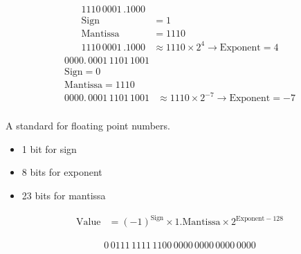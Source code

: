 \begin{example}
    \begin{align*}
        1110\,0001\,.1000 &                                                \\
        \text{Sign}       & = 1                                            \\
        \text{Mantissa}   & = 1110                                         \\
        1110\,0001\,.1000 & \approx 1110\times 2^4 \to \text{Exponent} = 4
    \end{align*}
    \begin{align*}
        0000.\,0001\,1101\,1001                                                      \\
        \text{Sign} = 0                                                              \\
        \text{Mantissa} = 1110                                                       \\
        0000.\,0001\,1101\,1001 & \approx 1110\times 2^{-7} \to \text{Exponent} = -7 \\
    \end{align*}

\end{example}

\begin{definition}
    [IEEE 754]
    A standard for floating point numbers. \\
    \begin{itemize}
        \item 1 bit for sign
        \item 8 bits for exponent
        \item 23 bits for mantissa
    \end{itemize}
\end{definition}

\begin{theorem}
    [IEEE 754]
    \begin{align*}
        \text{Value} & = (-1)^{\text{Sign}} \times 1.\text{Mantissa} \times 2^{\text{Exponent} - 128}
    \end{align*}
\end{theorem}

\begin{example}
    \begin{align*}
        0\,0111\,1111\,1100\,0000\,0000\,0000\,0000 \\
    \end{align*}
\end{example}